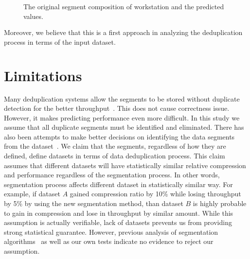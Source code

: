  \begin{figure}[!t]
\centerline{
\hfil
{}
}
\caption{The original segment composition of workstation and the predicted values.}
\label{pred}
\end{figure}

Moreover, we believe that this is a first approach in analyzing the deduplication process in terms of the input dataset. \\

\section{Limitations}\label{lim}
Many deduplication systems allow the segments to be stored without duplicate detection for the better throughput~\cite{bhagwat:2009, lillibridge:2009}. This does not cause correctness issue. However, it makes predicting performance even more difficult. In this study we assume that all duplicate segments must be identified and eliminated. There has also been attempts to make better decisions on identifying the data segments from the dataset~\cite{eshghi:2005, kruus:2010, bobbarjung:2006}. We claim that the segments, regardless of how they are defined, define datasets in terms of data deduplication process. This claim assumes that different datasets will have statistically similar relative compression and performance regardless of the segmentation process. In other words, segmentation process affects different dataset in statistically similar way. For example, if dataset $A$ gained compression ratio by 10\% while losing throughput by 5\% by using the new segmentation method, than dataset $B$ is highly probable to gain in compression and lose in throughput by similar amount. While this assumption is actually verifiable, lack of datasets prevents us from providing strong statistical guarantee. However, previous analysis of segmentation algorithms~\cite{kruus:2010} as well as our own tests indicate no evidence to reject our assumption.

